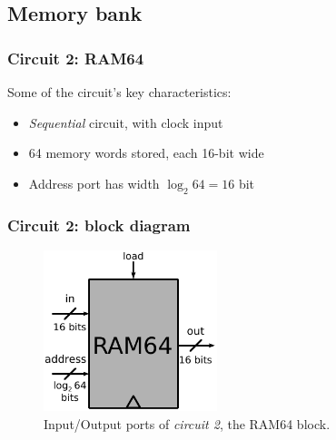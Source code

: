 \documentclass{beamer}
\begin{document}
        \subsection{Memory bank}
        \label{subsec:memory-bank}
            \begin{frame}
                \frametitle{Circuit 2: RAM64}

                \par{Some of the circuit's key characteristics:}

                \begin{itemize}
                    \item \emph{Sequential} circuit, with clock input
                    \item 64 memory words stored, each 16-bit wide
                    \item Address port has width $\log_{2} 64 = 16$ bit
                \end{itemize}
            \end{frame}

            \begin{frame}
                \frametitle{Circuit 2: block diagram}

                \begin{figure}[h!]
                    \centerline{\includegraphics[width=0.45\textwidth]{imgs/ram-block.pdf}}
                    \caption{Input/Output ports of \emph{circuit 2}, the RAM64 block.
                        \label{fig:ram-block}}
                \end{figure}
            \end{frame}
\end{document}
